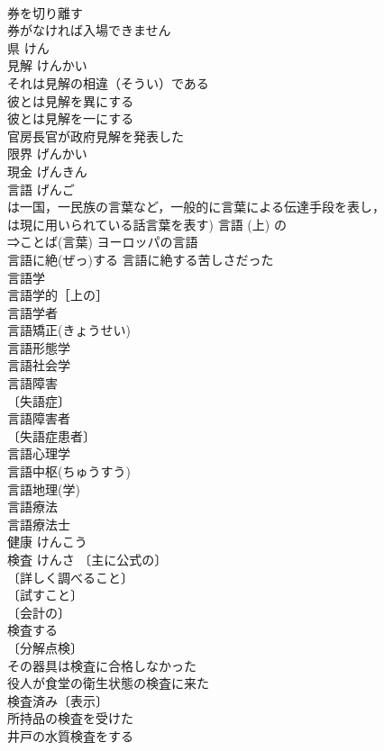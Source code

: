 \documentclass[8pt]{extreport}
\begin{document}
\begin{CJK}{UTF8}{min}
\\	券を切り離す 
\\	券がなければ入場できません 
\\	県	けん	
\\	見解	けんかい	
\\	それは見解の相違（そうい）である 
\\	彼とは見解を異にする 
\\	彼とは見解を一にする 
\\	官房長官が政府見解を発表した 
\\	限界	げんかい	
\\	現金	げんきん	
\\	言語	げんご	
\\	は一国，一民族の言葉など，一般的に言葉による伝達手段を表し，
\\	は現に用いられている話言葉を表す) 言語 (上) の 
\\	⇒ことば(言葉) ヨーロッパの言語 
\\	言語に絶(ぜっ)する 言語に絶する苦しさだった 
\\	言語学 
\\	言語学的［上の］ 
\\	言語学者 
\\	言語矯正(きょうせい) 
\\	言語形態学 
\\	言語社会学 
\\	言語障害 
\\	〔失語症〕
\\	言語障害者 
\\	〔失語症患者〕
\\	言語心理学 
\\	言語中枢(ちゅうすう) 
\\	言語地理(学) 
\\	言語療法 
\\	言語療法士 
\\	健康	けんこう	
\\	検査	けんさ	〔主に公式の〕
\\	〔詳しく調べること〕
\\	〔試すこと〕
\\	〔会計の〕
\\	検査する 
\\	〔分解点検〕
\\	その器具は検査に合格しなかった 
\\	役人が食堂の衛生状態の検査に来た 
\\	検査済み〔表示〕 
\\	所持品の検査を受けた 
\\	井戸の水質検査をする 

\end{CJK}
\end{document}

